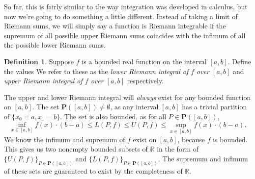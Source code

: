 \documentclass{article}
\newcommand{\R}{\mathbb{R}}
\theoremstyle{definition}
\newtheorem{definition}{Definition}[section]
\begin{document}
So far, this is fairly similar to the way integration was developed in calculus, but now we're going to do something a little different. Instead of taking a limit of Riemann sums, we will simply say a function is Riemann integrable if the supremum of all possible upper Riemann sums coincides with the infimum of all the possible lower Riemann sums. 
\begin{definition}
	Suppose $ f $ is a bounded real function  on the interval $ [a,b] $. Define the values  
	We refer to these as the \textit{\color{red}lower Riemann integral of $ f $ over $ [a,b] $} and \textit{\color{red}upper Riemann integral of $ f $ over $ [a,b] $} respectively.
\end{definition}
The upper and lower Riemann integral will \textit{always} exist for any bounded function on $ [a,b] $. The set $ \mathbf{P}([a,b])\neq\emptyset$, as any interval $ [a,b] $ has a trivial partition of $ \{x_0=a,x_1=b\} $. The set is also bounded, as for all $ P\in\mathbf{P}([a,b]) $, $$\inf_{x\in[a,b]}f(x)\cdot(b-a)\le L(P,f)\le U(P,f)\le \sup_{x\in[a,b]}f(x)\cdot(b-a) .$$ We know the infimum and supremum of $ f $ exist on $ [a,b] $, because $ f $ is bounded. This gives us two nonempty bounded subsets of $ \R $ in the form of $ \{U(P,f)\}_{P\in\textbf{P}([a,b])} $ and $ \{L(P,f)\}_{P\in\textbf{P}([a,b])} $. The supremum and infimum of these sets are guaranteed to exist by the completeness of $ \R $. 
\end{document}
